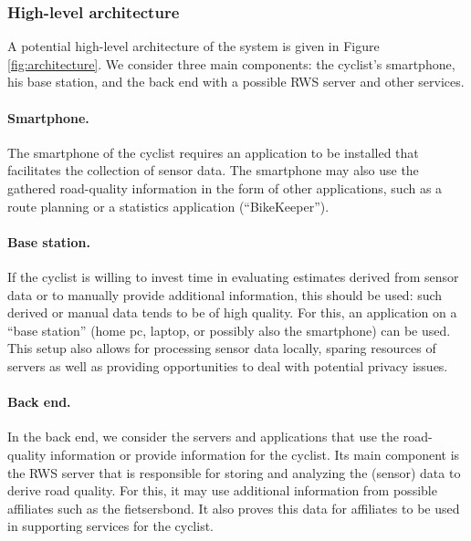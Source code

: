 \documentclass[a4paper,11pt]{article}
\begin{document}
\subsubsection{High-level architecture}

A potential high-level architecture of the system is given in Figure \ref{fig:architecture}. We consider three main components: the cyclist's smartphone, his base station, and the back end with a possible RWS server and other services.

\paragraph{Smartphone.}
The smartphone of the cyclist requires an application to be installed that facilitates the collection of sensor data. The smartphone may also use the gathered road-quality information in the form of other applications, such as a route planning or a statistics application (``BikeKeeper'').

\paragraph{Base station.}
If the cyclist is willing to invest time in evaluating estimates derived from sensor data or to manually provide additional information, this should be used: such derived or manual data tends to be of high quality. For this, an application on a ``base station'' (home pc, laptop, or possibly also the smartphone) can be used. This setup also allows for processing sensor data locally, sparing resources of servers as well as providing opportunities to deal with potential privacy issues.

\paragraph{Back end.}
In the back end, we consider the servers and applications that use the road-quality information or provide information for the cyclist. Its main component is the RWS server that is responsible for storing and analyzing the (sensor) data to derive road quality. For this, it may use additional information from possible affiliates such as the fietsersbond. It also proves this data for affiliates to be used in supporting services for the cyclist.
\end{document}
